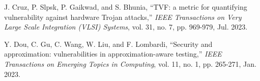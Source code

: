 \documentclass[10pt,journal, compsoc]{IEEEtran}
\begin{document}
\begin{thebibliography}{99}

J. Cruz, P. Slpsk, P. Gaikwad, and S. Bhunia, ``TVF: a metric for quantifying vulnerability against hardware Trojan attacks,'' \textit{IEEE Transactions on Very Large Scale Integration (VLSI) Systems}, vol. 31, no. 7, pp. 969-979, Jul. 2023.



Y. Dou, C. Gu, C. Wang, W. Liu, and F. Lombardi, ``Security and approximation: vulnerabilities in approximation-aware testing,'' \textit{IEEE Transactions on Emerging Topics in Computing}, vol. 11, no. 1, pp. 265-271, Jan. 2023.














\end{thebibliography}
\end{document}
